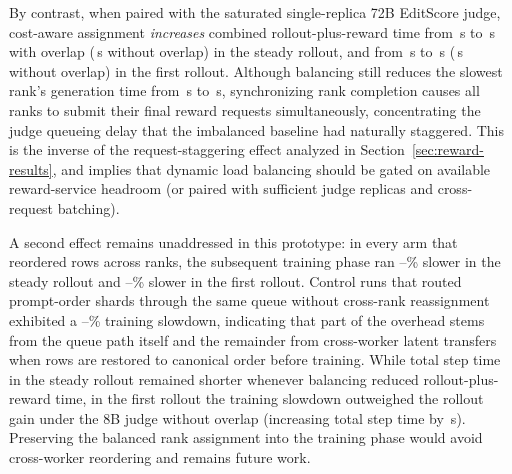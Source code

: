 By contrast, when paired with the saturated single-replica 72B EditScore judge, cost-aware assignment \emph{increases} combined rollout-plus-reward time from \RFLargeBase{}\,s to \RFLargeSteal{}\,s with overlap (\RFLargeStealNoOverlap{}\,s without overlap) in the steady rollout, and from \RFLargeFirstBase{}\,s to \RFLargeFirstSteal{}\,s (\RFLargeFirstStealNoOverlap{}\,s without overlap) in the first rollout.
Although balancing still reduces the slowest rank's generation time from \RFLargeTail{}\,s to \RFLargeTailSteal{}\,s, synchronizing rank completion causes all ranks to submit their final reward requests simultaneously, concentrating the judge queueing delay that the imbalanced baseline had naturally staggered.
This is the inverse of the request-staggering effect analyzed in Section~\ref{sec:reward-results}, and implies that dynamic load balancing should be gated on available reward-service headroom (or paired with sufficient judge replicas and cross-request batching).

A second effect remains unaddressed in this prototype: in every arm that reordered rows across ranks, the subsequent training phase ran \RFTrainSlowSteadyMin--\RFTrainSlowSteadyMax\% slower in the steady rollout and \RFTrainSlowFirstMin--\RFTrainSlowFirstMax\% slower in the first rollout.
Control runs that routed prompt-order shards through the same queue without cross-rank reassignment exhibited a \RFTrainSlowOwnerMin--\RFTrainSlowOwnerMax\% training slowdown, indicating that part of the overhead stems from the queue path itself and the remainder from cross-worker latent transfers when rows are restored to canonical order before training.
While total step time in the steady rollout remained shorter whenever balancing reduced rollout-plus-reward time, in the first rollout the training slowdown outweighed the rollout gain under the 8B judge without overlap (increasing total step time by \RFSmallFirstStepSteal{}\,s).
Preserving the balanced rank assignment into the training phase would avoid cross-worker reordering and remains future work.
